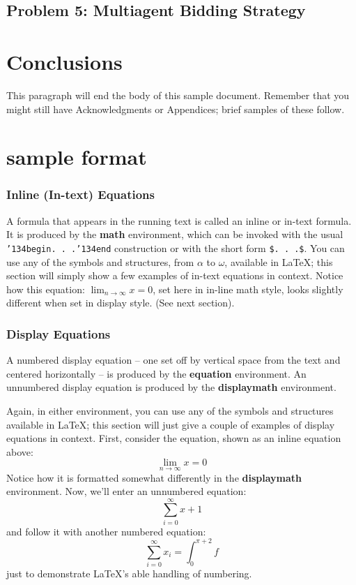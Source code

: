 \documentclass{sig-alternate-05-2015}
\begin{document}
\subsection{Problem 5: Multiagent Bidding Strategy}

\section{Conclusions}
This paragraph will end the body of this sample document.
Remember that you might still have Acknowledgments or
Appendices; brief samples of these
follow.




\section{sample format}

\subsubsection{Inline (In-text) Equations}
A formula that appears in the running text is called an
inline or in-text formula.  It is produced by the
\textbf{math} environment, which can be
invoked with the usual \texttt{{\char'134}begin. . .{\char'134}end}
construction or with the short form \texttt{\$. . .\$}. You
can use any of the symbols and structures,
from $\alpha$ to $\omega$, available in
\LaTeX\cite{Lamport:LaTeX}; this section will simply show a
few examples of in-text equations in context. Notice how
this equation: \begin{math}\lim_{n\rightarrow \infty}x=0\end{math},
set here in in-line math style, looks slightly different when
set in display style.  (See next section).

\subsubsection{Display Equations}
A numbered display equation -- one set off by vertical space
from the text and centered horizontally -- is produced
by the \textbf{equation} environment. An unnumbered display
equation is produced by the \textbf{displaymath} environment.

Again, in either environment, you can use any of the symbols
and structures available in \LaTeX; this section will just
give a couple of examples of display equations in context.
First, consider the equation, shown as an inline equation above:
\begin{equation}\lim_{n\rightarrow \infty}x=0\end{equation}
Notice how it is formatted somewhat differently in
the \textbf{displaymath}
environment.  Now, we'll enter an unnumbered equation:
\begin{displaymath}\sum_{i=0}^{\infty} x + 1\end{displaymath}
and follow it with another numbered equation:
\begin{equation}\sum_{i=0}^{\infty}x_i=\int_{0}^{\pi+2} f\end{equation}
just to demonstrate \LaTeX's able handling of numbering.
\end{document}
